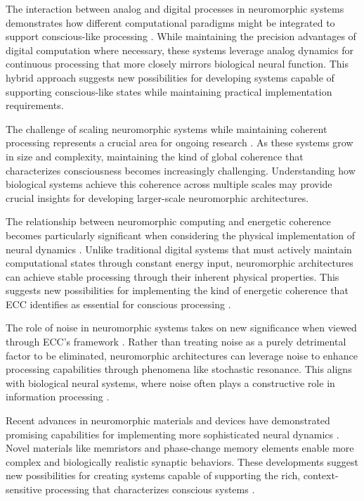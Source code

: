 The interaction between analog and digital processes in neuromorphic systems demonstrates how different computational paradigms might be integrated to support conscious-like processing \cite{Markovic2020}. While maintaining the precision advantages of digital computation where necessary, these systems leverage analog dynamics for continuous processing that more closely mirrors biological neural function. This hybrid approach suggests new possibilities for developing systems capable of supporting conscious-like states while maintaining practical implementation requirements.

The challenge of scaling neuromorphic systems while maintaining coherent processing represents a crucial area for ongoing research \cite{Merolla2019}. As these systems grow in size and complexity, maintaining the kind of global coherence that characterizes consciousness becomes increasingly challenging. Understanding how biological systems achieve this coherence across multiple scales may provide crucial insights for developing larger-scale neuromorphic architectures.

The relationship between neuromorphic computing and energetic coherence becomes particularly significant when considering the physical implementation of neural dynamics \cite{Neftci2019}. Unlike traditional digital systems that must actively maintain computational states through constant energy input, neuromorphic architectures can achieve stable processing through their inherent physical properties. This suggests new possibilities for implementing the kind of energetic coherence that ECC identifies as essential for conscious processing \cite{Roy2019}.

The role of noise in neuromorphic systems takes on new significance when viewed through ECC's framework \cite{Schuman2021}. Rather than treating noise as a purely detrimental factor to be eliminated, neuromorphic architectures can leverage noise to enhance processing capabilities through phenomena like stochastic resonance. This aligns with biological neural systems, where noise often plays a constructive role in information processing \cite{Sebastian2020}.

Recent advances in neuromorphic materials and devices have demonstrated promising capabilities for implementing more sophisticated neural dynamics \cite{Thakur2018}. Novel materials like memristors and phase-change memory elements enable more complex and biologically realistic synaptic behaviors. These developments suggest new possibilities for creating systems capable of supporting the rich, context-sensitive processing that characterizes conscious systems \cite{Wang2018}.

